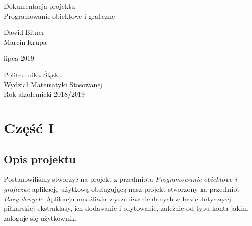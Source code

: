 \documentclass[12pt,a4paper]{article}
\begin{document}
    \begin{titlepage}
       \begin{center}
           \vspace*{1cm}
           
           {\fontsize{23}{25}\selectfont Dokumentacja projektu\\Programowanie obiektowe i graficzne}
     
            \vspace{1.0cm}
        
            {\fontsize{17}{18}\selectfont Dawid Bitner \\ Marcin Krupa}
           
            \vspace{0.4cm}
           
            {\fontsize{12}{13} lipca 2019}
           
            \vfill
            \vspace{0.8cm}
     
            {\fontsize{13}{14}\selectfont Politechnika Śląska\\Wydział Matematyki Stosowanej\\Rok akademicki 2018/2019}
     
       \end{center}
    \end{titlepage}
	\newpage
	\tableofcontents
	\newpage
	\section{Część I}
	\subsection{Opis projektu}
        Postanowiliśmy stworzyć na projekt z przedmiotu \textit{Programowanie obiektowe i graficzne} aplikację użytkową obsługującą nasz projekt stworzony na przedmiot \textit{Bazy danych}. Aplikacja umożliwia wyszukiwanie danych w bazie dotyczącej piłkarskiej ekstraklasy, ich dodawanie i edytowanie, zależnie od typu konta jakim zaloguje się użytkownik.
        
\end{document}

